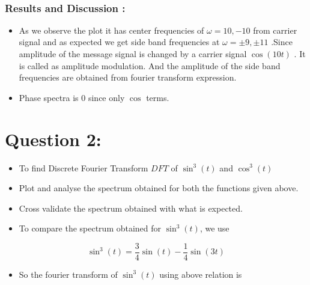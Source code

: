 \documentclass[11pt]{article}
\providecommand{\tightlist}{%
      \setlength{\itemsep}{0pt}\setlength{\parskip}{0pt}}
\begin{document}
    \begin{center}
    \end{center}
    { \hspace*{\fill} \\}
    
    \subsubsection{Results and Discussion :}\label{results-and-discussion}

\begin{itemize}
\tightlist
\item
  As we observe the plot it has center frequencies of
  \(\omega = 10,-10\) from carrier signal and as expected we get side
  band frequencies at $\omega = \pm 9 , \pm 11 $ .Since amplitude of
  the message signal is changed by a carrier signal \(\cos(10t)\) . It
  is called as amplitude modulation. And the amplitude of the side band
  frequencies are obtained from fourier transform expression.
\item
  Phase spectra is 0 since only $\cos $ terms.
\end{itemize}

    \section{Question 2:}\label{question-2}

\begin{itemize}
\tightlist
\item
  To find Discrete Fourier Transform \(DFT\) of \(\sin ^{3}(t)\) and
  \(\cos^{3}(t)\)
\item
  Plot and analyse the spectrum obtained for both the functions given
  above.
\item
  Cross validate the spectrum obtained with what is expected.
\item
  To compare the spectrum obtained for \(\sin^{3}(t)\), we use
\end{itemize}

\begin{equation}
\sin^{3}(t) = \frac{3}{4}\sin(t) - \frac{1}{4}\sin(3t)
\end{equation}

\begin{itemize}
\tightlist
\item
  So the fourier transform of \(\sin^{3}(t)\) using above relation is
\end{itemize}
\end{document}
